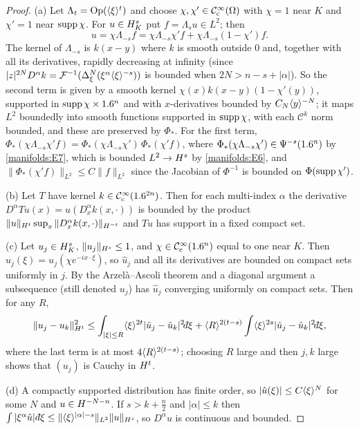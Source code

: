 \begin{proof}
(a) Let $\Lambda_t=\operatorname{Op}(\langle \xi\rangle^t)$ and choose $\chi,\chi'\in\mathcal{C}^\infty_{\mathrm{c}}(\Omega)$ with $\chi=1$ near
$K$ and $\chi'=1$ near $\operatorname{supp}\chi$. For $u\in H^{s}_K$ put $f=\Lambda_su\in L^2$; then
\begin{equation*}
u=\chi\Lambda_{-s}f=\chi\Lambda_{-s}\chi'f+\chi\Lambda_{-s}(1-\chi')f.
\end{equation*}
The kernel of $\Lambda_{-s}$ is $k(x-y)$ where $k$ is smooth outside $0$ and,
together with all its derivatives, rapidly decreasing at infinity (since
$|z|^{2N}D^\alpha k=\mathcal{F}^{-1}(\Delta_\xi^N(\xi^\alpha\langle \xi\rangle^{-s}))$ is bounded when $2N>n-s+|\alpha|$).
So the second term is given by a smooth kernel $\chi(x)k(x-y)(1-\chi'(y))$, supported
in $\operatorname{supp}\chi\times1.6^n$ and with $x$-derivatives bounded by $C_N\langle y\rangle^{-N}$; it maps
$L^2$ boundedly into smooth functions supported in $\operatorname{supp}\chi$, with each
$\mathcal C^k$ norm bounded, and these are preserved by $\Phi_*$. For the first term,
$\Phi_*(\chi\Lambda_{-s}\chi'f)=\Phi_*(\chi\Lambda_{-s}\chi')\,\Phi_*(\chi'f)$, where
$\Phi_*(\chi\Lambda_{-s}\chi')\in\Psi^{-s}(1.6^n)$ by \ref{manifolds:E7}, which is bounded
$L^2\to H^{s}$ by \ref{manifolds:E6}, and $\|\Phi_*(\chi'f)\|_{L^2}\le C\|f\|_{L^2}$ since the
Jacobian of $\Phi^{-1}$ is bounded on $\Phi(\operatorname{supp}\chi')$.

(b) Let $T$ have kernel $k\in\mathcal{C}^\infty_{\mathrm{c}}(1.6^{2n})$. Then for each multi-index $\alpha$ the
derivative $D^\alpha Tu(x)=u(D^\alpha_xk(x,\cdot))$ is bounded by the product
$\|u\|_{H^{t}}\sup_x\|D_x^\alpha k(x,\cdot)\|_{H^{-t}}$ and $Tu$ has support in a
fixed compact set.

(c) Let $u_j\in H^{s}_K$, $\|u_j\|_{H^{s}}\le1$, and $\chi\in\mathcal{C}^\infty_{\mathrm{c}}(1.6^n)$ equal to one near $K$.
Then $\hat u_j(\xi)=u_j(\chi e^{-ix\cdot\xi})$, so $\hat u_j$ and all its derivatives are
bounded on compact sets uniformly in $j$. By the Arzel\`a--Ascoli theorem and a
diagonal argument a subsequence (still denoted $u_j$) has $\hat u_j$ converging
uniformly on compact sets. Then for any $R$,
\begin{equation*}
\|u_j-u_k\|_{\Hs t}^2\le\int_{|\xi|\le R}\ang\xi^{2t}|\hat u_j-\hat u_k|^2\dbar\xi
+\ang R^{2(t-s)}\int\ang\xi^{2s}|\hat u_j-\hat u_k|^2\dbar\xi ,
\end{equation*}
where the last term is at most $4\langle R\rangle^{2(t-s)}$; choosing $R$ large and then $j,k$
large shows that $(u_j)$ is Cauchy in $H^{t}$.

(d) A compactly supported distribution has finite order, so $|\hat u(\xi)|\le C\langle \xi\rangle^N$
for some $N$ and $u\in H^{-N-n}$. If $s>k+\frac n2$ and $|\alpha|\le k$ then
$\int|\xi^\alpha\hat u|\,\dbar\xi\le\|\ang\xi^{|\alpha|-s}\|_{L^2}\|u\|_{\Hs s}$, so
$D^\alpha u$ is continuous and bounded.
\end{proof}

